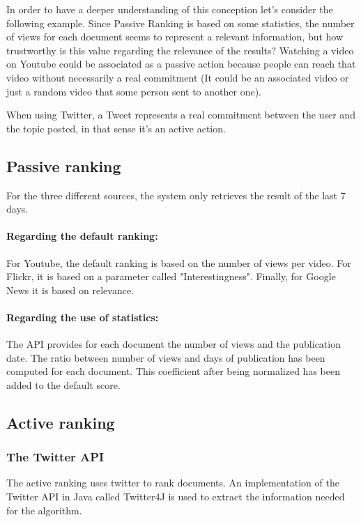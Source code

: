 \documentclass{acmsmall}
\begin{document}
In order to have a deeper understanding of this conception let's consider the following example. Since Passive Ranking is based on some statistics, the number of views for each document seems to represent a relevant information, but how trustworthy is this value regarding the relevance of the results?
Watching a video on Youtube could be associated as a passive action because people can reach that video without necessarily a real commitment (It could be an associated video or just a random video that some person sent to another one).

When using Twitter, a Tweet represents a real commitment between the user and the topic posted, in that sense it's an active action.

\subsection{Passive ranking}
For the three different sources, the system only retrieves the result of the last 7 days. 

\paragraph{Regarding the default ranking:}
For Youtube, the default ranking is based on the number of views per video. For Flickr, it is based on a parameter called "Interestingness". Finally, for Google News it is based on relevance.

\paragraph{Regarding the use of statistics:}
The API provides for each document the number of views and the publication date. The ratio between number of views and days of publication has been computed for each document. This coefficient after being normalized has been added to the default score.

\subsection{Active ranking}

\subsubsection{The Twitter API}
The active ranking uses twitter to rank documents. An implementation of the Twitter API in Java called Twitter4J is used to extract the information needed for the algorithm.
\end{document}
